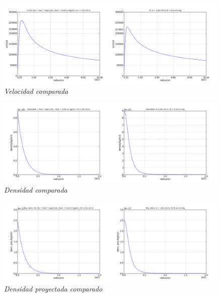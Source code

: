 \documentclass[12pt]{book}
\begin{document}
\begin{figure}[!ht]
 \centering
 \includegraphics[scale=0.3]{vcAnComp.png}
 \caption{\emph{Velocidad comparada}}
\end{figure}

\begin{figure}[!ht]
 \centering
 \includegraphics[scale=0.3]{densAnComp.png}
 \caption{\emph{Densidad comparada}}
\end{figure}

\begin{figure}[!ht]
 \centering
 \includegraphics[scale=0.3]{dpAnComp.png}
 \caption{\emph{Densidad proyectada comparado}}
\end{figure}


\clearpage
\end{document}
